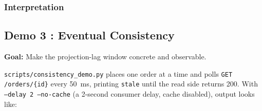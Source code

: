 \documentclass[11pt,a4paper]{article}
\newcommand{\code}[1]{\texttt{\small #1}}
\newcommand{\file}[1]{\textcolor{primary}{\texttt{\small #1}}}
\begin{document}

\subsubsection{Interpretation}




\subsection{Demo 3 : Eventual Consistency}

\textbf{Goal:} Make the projection-lag window concrete and observable.

\file{scripts/consistency\_demo.py} places one order at a time and polls \code{GET /orders/\{id\}} every 50~ms, printing \code{stale} until the read side returns 200. With \code{--delay 2 --no-cache} (a 2-second consumer delay, cache disabled), output looks like:
\end{document}
